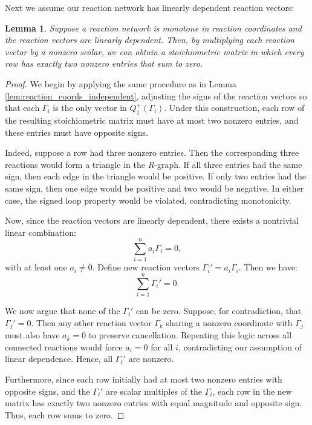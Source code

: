 \documentclass{article}
\newtheorem{lem}{Lemma}
\begin{document}
Next we assume our reaction network has linearly dependent reaction vectors:




\begin{lem}
\label{lem:monotone_in_react_coords_2_entries_per_row}
Suppose a reaction network is monotone in reaction coordinates and the reaction vectors are linearly dependent. Then, by multiplying each reaction vector by a nonzero scalar, we can obtain a stoichiometric matrix in which every row has exactly two nonzero entries that sum to zero.
\end{lem}

\begin{proof}
We begin by applying the same procedure as in Lemma \ref{lem:reaction_coords_independent}, adjusting the signs of the reaction vectors so that each \( \Gamma_i \) is the only vector in \( Q_1^+(\Gamma_i) \). Under this construction, each row of the resulting stoichiometric matrix must have at most two nonzero entries, and these entries must have opposite signs.

Indeed, suppose a row had three nonzero entries. Then the corresponding three reactions would form a triangle in the \( R \)-graph. If all three entries had the same sign, then each edge in the triangle would be positive. If only two entries had the same sign, then one edge would be positive and two would be negative. In either case, the signed loop property would be violated, contradicting monotonicity.

Now, since the reaction vectors are linearly dependent, there exists a nontrivial linear combination:
\[
\sum_{i=1}^n a_i \Gamma_i = 0,
\]
with at least one \( a_i \neq 0 \). Define new reaction vectors \( \Gamma_i' = a_i \Gamma_i \). Then we have:
\[
\sum_{i=1}^n \Gamma_i' = 0.
\]

We now argue that none of the \( \Gamma_i' \) can be zero. Suppose, for contradiction, that \( \Gamma_j' = 0 \). Then any other reaction vector \( \Gamma_k \) sharing a nonzero coordinate with \( \Gamma_j \) must also have \( a_k = 0 \) to preserve cancellation. Repeating this logic across all connected reactions would force \( a_i = 0 \) for all \( i \), contradicting our assumption of linear dependence. Hence, all \( \Gamma_i' \) are nonzero.

Furthermore, since each row initially had at most two nonzero entries with opposite signs, and the \( \Gamma_i' \) are scalar multiples of the \( \Gamma_i \), each row in the new matrix has exactly two nonzero entries with equal magnitude and opposite sign. Thus, each row sums to zero.
\end{proof}
\end{document}
